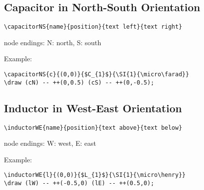 \documentclass[parskip=full]{scrartcl}
\begin{document}
\subsection{Capacitor in North-South Orientation}

\begin{verbatim}
\capacitorNS{name}{position}{text left}{text right}
\end{verbatim}
node endings: N: north, S: south

Example:\\
\begin{minipage}{0.8\textwidth}
\begin{verbatim}
\capacitorNS{c}{(0,0)}{$C_{1}$}{\SI{1}{\micro\farad}}
\draw (cN) -- ++(0,0.5) (cS) -- ++(0,-0.5);
\end{verbatim}
\end{minipage}
\begin{minipage}{0.19\textwidth}
\end{minipage}

\subsection{Inductor in West-East Orientation}

\begin{verbatim}
\inductorWE{name}{position}{text above}{text below}
\end{verbatim}
node endings: W: west, E: east

Example:\\
\begin{minipage}{0.8\textwidth}
\begin{verbatim}
\inductorWE{l}{(0,0)}{$L_{1}$}{\SI{1}{\micro\henry}}
\draw (lW) -- ++(-0.5,0) (lE) -- ++(0.5,0);
\end{verbatim}
\end{minipage}
\begin{minipage}{0.19\textwidth}
\end{minipage}
\end{document}
